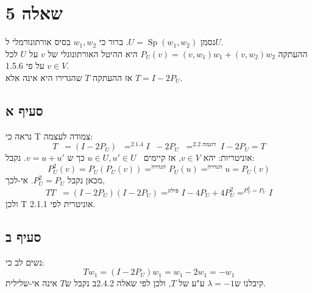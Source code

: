 \documentclass{article}
\DeclareMathOperator*{\equals}{=}
\DeclareMathOperator{\adj}{^\ast}
\DeclareMathOperator{\perc}{^\perp}
\DeclareMathOperator{\Sp}{Sp}
\begin{document}
\pagebreak

\section*{שאלה 5}

נסמן $U=\Sp({ w_1, w_2 })$. ברור כי ${w_1, w_2}$ בסיס אורתונורמלי ל$U$.\\
ההעתקה $P_U(v)=(v, w_1)w_1+(v,w_2)w_2$ היא ההיטל האורתונוגלי של $v$ על $U$ לכל $v\in V$ על פי 1.5.6.\\
אז ההעתקה $T$ שהגדירו היא אינה אלא $T=I-2P_U$.

\subsection*{סעיף א}
נראה כי T צמודה לעצמה:
\[
    T\adj = (I-2P_U)\adj \equals^{2.1.4}
    I\adj - 2P_U\adj \equals^{2.2\text{ דוגמה }} I-2P_U=T
\]
אוניטריות:
יהא $v\in V$, אז קיימים $u\in U, u'\in U\perc$ כך ש $v=u+u'$. נקבל:
\[
    P_U^2(v)=P_U(P_U(v))\equals^{\text{הגדרה}}P_U(u)\equals^{\text{הגדרה}}u=P_U(v)
\]
מכאן נקבל $P_U^2=P_U$. אי-לכך,
\[
    TT\adj = (I-2P_U)(I-2P_U)\equals^{\text{פילוג}} I - 4P_U + 4P_U^2 \equals^{P_U^2=P_U}I
\]
ולכן T אוניטרית לפי 2.1.1.

\subsection*{סעיף ב}

נשים לב כי:
\[
    Tw_1=(I-2P_U)w_1=w_1-2w_1=-w_1
\]
קיבלנו ש$\lambda=-1$ ע"ע של $T$, ולכן לפי שאלה 2.4.2ב נקבל ש$T$ אינה אי-שלילית.
\end{document}
